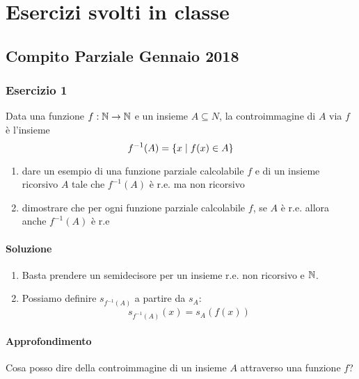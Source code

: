 \chapter{Esercizi svolti in classe}

\section{Compito Parziale Gennaio 2018}

\subsection{Esercizio 1}

Data una funzione $f:\mathbb{N} \to \mathbb{N}$ e un insieme $A \subseteq N$, la controimmagine di $A$ via $f$ è l’insieme
\begin{equation*}
    f^{-1}(A) = \{x \mid f(x) \in A\}
\end{equation*}
\begin{enumerate}[label=(\alph*) ]
    \item dare un esempio di una funzione parziale calcolabile $f$ e di un insieme ricorsivo $A$
    tale che $f^{-1}(A)$ è r.e.  ma non ricorsivo
    \item dimostrare che per ogni funzione parziale calcolabile $f$, se $A$ è r.e. allora anche
    $f^{-1}(A)$ è r.e
\end{enumerate}

\subsubsection{Soluzione}

\begin{enumerate}[label=(\alph*) ]
    \item Basta prendere un semidecisore per un insieme r.e. non ricorsivo e $\mathbb{N}$. 
    \item Possiamo definire $s_{f^{-1}(A)}$ a partire da $s_{A}$:
    \begin{equation*}
        s_{f^{-1}(A)}(x) = s_{A}(f(x))
    \end{equation*}
\end{enumerate}

\subsubsection{Approfondimento}

Cosa posso dire della controimmagine di un insieme $A$ attraverso una funzione $f$? 

